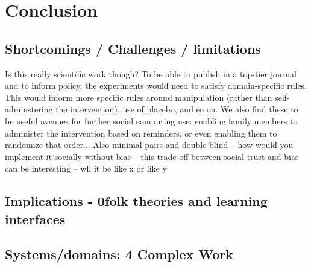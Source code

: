 
\chapter{Conclusion}


\section{Shortcomings / Challenges / limitations}
Is this really scientific work though? To be able to publish in a top-tier journal and to inform policy, the experiments would need to satisfy domain-specific rules. This would inform more specific rules around manipulation (rather than self-adminstering the intervention), use of placebo, and so on. We also find these to be useful avenues for further social computing use: enabling family members to administer the intervention based on reminders, or even enabling them to randomize that order... 
	Also minimal pairs and double blind -- how would you implement it socially without bias -- this trade-off between social trust and bias can be interesting -- wll it be like x or like y



\section{Implications - 0folk theories and learning interfaces}


\section{Systems/domains: 4 Complex Work} 


